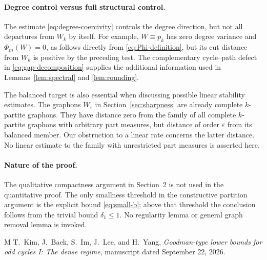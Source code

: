 \documentclass[11pt]{article}
\theoremstyle{remark}
\begin{document}
\paragraph{Degree control versus full structural control.}
The estimate \eqref{eq:degree-coercivity} controls the degree direction,
but not all departures from $W_k$ by itself.
For example, $W\equiv p_k$ has zero degree variance and
$\Phi_m(W)=0$, as follows directly from \eqref{eq:Phi-definition},
but its cut distance from $W_k$ is positive by the preceding test.
The complementary cycle--path defect in
\eqref{eq:gap-decomposition} supplies the additional information used
in Lemmas~\ref{lem:spectral} and \ref{lem:rounding}.

The balanced target is also essential when discussing possible linear
stability estimates. The graphons $W_\varepsilon$ in
Section~\ref{sec:sharpness} are already complete $k$-partite graphons.
They have distance zero from the family of all complete $k$-partite
graphons with arbitrary part measures, but distance of order
$\varepsilon$ from its balanced member. Our obstruction to a linear
rate concerns the latter distance. No linear estimate to the family
with unrestricted part measures is asserted here.

\paragraph{Nature of the proof.}
The qualitative compactness argument in Section~2 is not used in the
quantitative proof. The only smallness threshold in the constructive
partition argument is the explicit bound \eqref{eq:small-b}; above
that threshold the conclusion follows from the trivial bound
$\delta_1\leq1$. No regularity lemma or general graph removal lemma
is invoked.

\begin{thebibliography}{M}
T.~Kim, J.~Baek, S.~Im, J.~Lee, and H.~Yang,
\emph{Goodman-type lower bounds for odd cycles I: The dense regime},
manuscript dated September 22, 2026.
\end{thebibliography}
\end{document}
